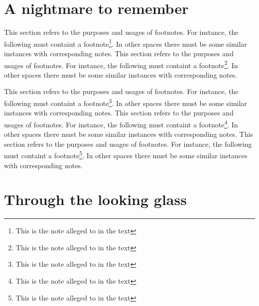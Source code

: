\chapter{A nightmare to remember}

\newcommand{\afootnote}{This section refers to the purposes and usages of footnotes. For instance, the following must containt a footnote\footnote{This is the note alleged to in the text}. In other spaces there must be some similar instances with corresponding notes.}

\afootnote
{}
\lipsum[1-5]
\afootnote

\lipsum[6-8]
\afootnote
{}
\afootnote
{}
\afootnote
\lipsum[9-12]
\chapter{Through the looking glass}
\lipsum[25-26]
\lipsum[27-50]